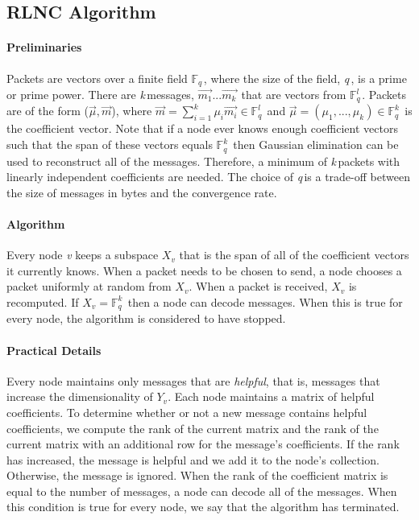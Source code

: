 \documentclass{article} %
\def\numMessages{\textit{k}\,}
\def\fieldSize{\textit{q}\,}
\begin{document}
\subsection{RLNC Algorithm}\label{subsec:RLNC}
\paragraph{Preliminaries}
Packets are vectors over a finite field $\mathbb{F}_{\fieldSize}$, where the size of the field, \fieldSize, is a prime or prime power. There are \numMessages messages, $\vec{m_{1}}...\vec{m_{\numMessages}}$ that are vectors from $\mathbb{F}_{\fieldSize}^{l}$. Packets are of the form ($\vec{\mu}, \vec{m}$), where $\vec{m} = \sum_{i=1}^{\numMessages} \mu_i\vec{m_i} \in \mathbb{F}_{\fieldSize}^{l}$ and $\vec{\mu} = (\mu_1,...,\mu_k) \in \mathbb{F}_{\fieldSize}^{\numMessages}$ is the coefficient vector. Note that if a node ever knows enough coefficient vectors such that the span of these vectors equals $\mathbb{F}_{\fieldSize}^{\numMessages}$ then Gaussian elimination can be used to reconstruct all of the messages. Therefore, a minimum of \numMessages packets with linearly independent coefficients are needed. The choice of \fieldSize is a trade-off between the size of messages in bytes and the convergence rate. 
\paragraph{Algorithm}
Every node \textit{v} keeps a subspace $X_v$ that is the span of all of the coefficient vectors it currently knows. When a packet needs to be chosen to send, a node chooses a packet uniformly at random from $X_v$. When a packet is received, $X_v$ is recomputed. If $X_v = \mathbb{F}_{\fieldSize}^{\numMessages}$ then a node can decode messages. When this is true for every node, the algorithm is considered to have stopped. 
\paragraph{Practical Details}
Every node maintains only messages that are \textit{helpful}, that is, messages that increase the dimensionality of $Y_v$. Each node maintains a matrix of helpful coefficients. To determine whether or not a new message contains helpful coefficients, we compute the rank of the current matrix and the rank of the current matrix with an additional row for the message's coefficients. If the rank has increased, the message is helpful and we add it to the node's collection. Otherwise, the message is ignored. When the rank of the coefficient matrix is equal to the number of messages, a node can decode all of the messages. When this condition is true for every node, we say that the algorithm has terminated.
\end{document}
